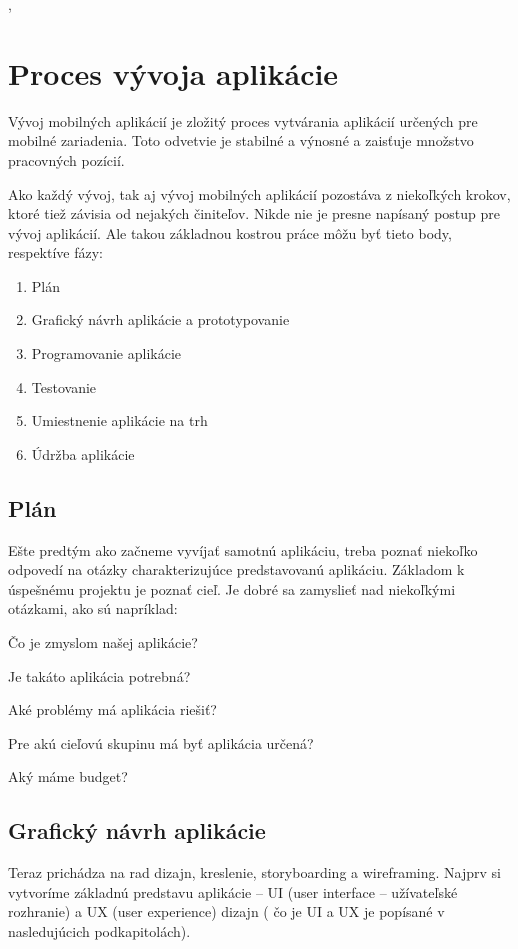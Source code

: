 \documentclass[10pt,twoside,slovak,a4paper]{article}
\begin{document}
\cite{winpc},



\section{Proces vývoja aplikácie}
\quad Vývoj mobilných aplikácií je zložitý proces vytvárania aplikácií určených pre mobilné zariadenia. Toto odvetvie je stabilné a výnosné a zaisťuje množstvo pracovných pozícií.

Ako každý vývoj, tak aj vývoj mobilných aplikácií pozostáva z niekoľkých krokov, ktoré tiež závisia od nejakých činiteľov. Nikde nie je presne napísaný postup pre vývoj aplikácií. Ale takou základnou kostrou práce môžu byť tieto body, respektíve fázy:

	\begin{enumerate}
	\item Plán
	\item Grafický návrh aplikácie a prototypovanie
	\item Programovanie aplikácie
	\item Testovanie
	\item Umiestnenie aplikácie na trh
	\item Údržba aplikácie
	\end{enumerate}

\cite{eYewated2, wiki1}



\subsection{Plán} \label{}
\quad Ešte predtým ako začneme vyvíjať samotnú aplikáciu, treba poznať niekoľko odpovedí na otázky charakterizujúce predstavovanú aplikáciu. Základom k úspešnému projektu je poznať cieľ. Je dobré sa zamyslieť nad niekoľkými otázkami, ako sú napríklad:

Čo je zmyslom našej aplikácie?

Je takáto aplikácia potrebná?

Aké problémy má aplikácia riešiť?

Pre akú cieľovú skupinu má byť aplikácia určená?

Aký máme budget?

\cite{EMM1, Synetech}



\subsection{Grafický návrh aplikácie}
\quad Teraz prichádza na rad dizajn, kreslenie, storyboarding a wireframing. Najprv si vytvoríme základnú predstavu aplikácie – UI (user interface – užívateľské rozhranie) a UX (user experience) dizajn ( čo je UI a UX je popísané v nasledujúcich podkapitolách).
\end{document}
